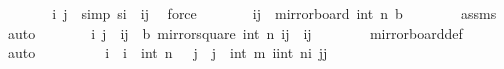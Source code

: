 \begin{isabellebody}
\ \ \ \ \isamarkupfalse%
\ \isamarkupfalse%
\ i{\isacharprime}{\kern0pt}\ j{\isacharprime}{\kern0pt}\ \ {\isacharbrackleft}{\kern0pt}simp{\isacharbrackright}{\kern0pt}{\isacharcolon}{\kern0pt}\ {\isachardoublequoteopen}s\isactrlsub i{\isacharprime}{\kern0pt}\ {\isacharequal}{\kern0pt}\ {\isacharparenleft}{\kern0pt}i{\isacharprime}{\kern0pt}{\isacharcomma}{\kern0pt}j{\isacharprime}{\kern0pt}{\isacharparenright}{\kern0pt}{\isachardoublequoteclose}\ \isamarkupfalse%
\ force\isanewline
\ \ \ \ \isamarkupfalse%
\ \isamarkupfalse%
\ {\isachardoublequoteopen}{\isacharparenleft}{\kern0pt}i{\isacharprime}{\kern0pt}{\isacharcomma}{\kern0pt}j{\isacharprime}{\kern0pt}{\isacharparenright}{\kern0pt}\ {\isasymin}\ mirror{}{\isacharunderscore}{\kern0pt}board\ {\isacharparenleft}{\kern0pt}int\ n{\isacharplus}{\kern0pt}{}{\isacharparenright}{\kern0pt}\ {\isacharquery}{\kern0pt}b{\isachardoublequoteclose}\isanewline
\ \ \ \ \ \ \isamarkupfalse%
\ assms\ \isamarkupfalse%
\ auto\isanewline
\ \ \ \ \isamarkupfalse%
\ \isamarkupfalse%
\ i\ j\ \ {\isachardoublequoteopen}{\isacharparenleft}{\kern0pt}i{\isacharcomma}{\kern0pt}j{\isacharparenright}{\kern0pt}\ {\isasymin}\ {\isacharquery}{\kern0pt}b{\isachardoublequoteclose}\ {\isachardoublequoteopen}mirror{}{\isacharunderscore}{\kern0pt}square\ {\isacharparenleft}{\kern0pt}int\ n{\isacharplus}{\kern0pt}{}{\isacharparenright}{\kern0pt}\ {\isacharparenleft}{\kern0pt}i{\isacharcomma}{\kern0pt}j{\isacharparenright}{\kern0pt}\ {\isacharequal}{\kern0pt}\ {\isacharparenleft}{\kern0pt}i{\isacharprime}{\kern0pt}{\isacharcomma}{\kern0pt}j{\isacharprime}{\kern0pt}{\isacharparenright}{\kern0pt}{\isachardoublequoteclose}\isanewline
\ \ \ \ \ \ \isamarkupfalse%
\ mirror{}{\isacharunderscore}{\kern0pt}board{\isacharunderscore}{\kern0pt}def\ \isamarkupfalse%
\ auto\isanewline
\ \ \ \ \isamarkupfalse%
\ \isamarkupfalse%
\ {\isachardoublequoteopen}{}\ {\isasymle}\ i\ {\isasymand}\ i\ {\isasymle}\ int\ n{\isachardoublequoteclose}\ {\isachardoublequoteopen}{}\ {\isasymle}\ j\ {\isasymand}\ j\ {\isasymle}\ int\ m{\isachardoublequoteclose}\ {\isachardoublequoteopen}i{\isacharprime}{\kern0pt}{\isacharequal}{\kern0pt}{\isacharparenleft}{\kern0pt}int\ n{\isacharplus}{\kern0pt}{}{\isacharparenright}{\kern0pt}{\isacharminus}{\kern0pt}i{\isachardoublequoteclose}\ {\isachardoublequoteopen}j{\isacharprime}{\kern0pt}{\isacharequal}{\kern0pt}j{\isachardoublequoteclose}\isanewline

\end{isabellebody}
